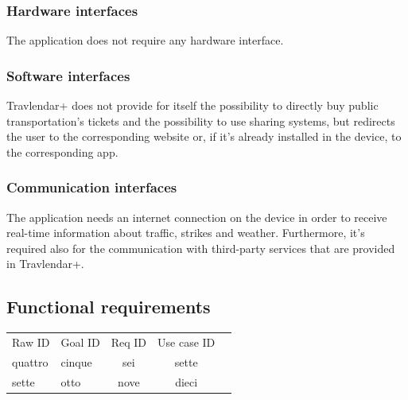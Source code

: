 \documentclass[12pt,titlepage]{article}
\begin{document}
\subsubsection{Hardware interfaces}\label{sec:mod1}
The application does not require any hardware interface. 

\subsubsection{Software interfaces}\label{sec:mod1}
Travlendar+ does not provide for itself the possibility to directly buy public transportation's tickets and the possibility to use sharing systems, but redirects the user to the corresponding website or, if it's already installed in the device, to the corresponding app.

\subsubsection{Communication interfaces}\label{sec:mod1}
The application needs an internet connection on the device in order to receive real-time information about traffic, strikes and weather. Furthermore, it's required also for the communication with third-party services that are provided in Travlendar+. 

\subsection{Functional requirements}\label{sec:mod1}
\begin{tabular}{llccr}
\rowcolor{red}
 Raw ID & Goal ID & Req ID & Use case ID \\
\rowcolor{lightgray}
 quattro & cinque & sei & sette \\
\rowcolor{anti-flashwhite}
sette & otto & nove & dieci 
\end{tabular}
\end{document}
